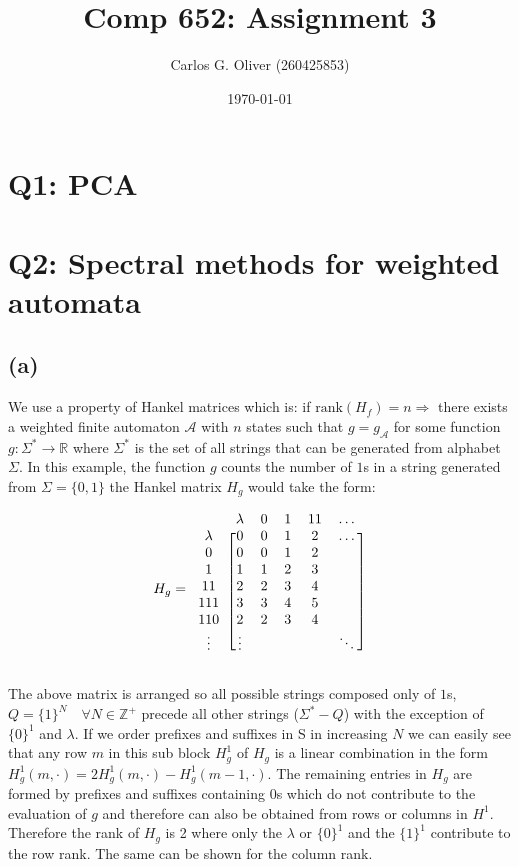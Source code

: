 \documentclass[11pt]{amsart}
\title{Comp 652: Assignment 3}
\author{Carlos G. Oliver (260425853)}
\date{\today}                                           %
\begin{document}
\maketitle

\section{Q1: PCA}

\section{Q2: Spectral methods for weighted automata}
\subsection{(a)}

We use a property of Hankel matrices which is: if $\text{rank}(H_f) = n \Rightarrow$ there exists a weighted finite automaton $\mathcal{A}$  with $n$ states such that $g = g_{\mathcal{A}}$ for some function $g : \Sigma^{*} \rightarrow \mathbb{R}$ where $\Sigma^{*}$ is the set of all strings that can be generated from alphabet $\Sigma$. In this example, the function $g$ counts the number of $1$s in a string generated from $\Sigma = \{0, 1\}$ the Hankel matrix $H_g$ would take the form: 


 
\[
H_g = \begin{blockarray}{cccccc}
\def\ra{\color{red}\ba}
 & \lambda & 0 & 1 & 11 & \hdots \\
\begin{block}{c[ccccc]}
  \lambda & 0 & 0 & 1 & 2 & \hdots \\
  0 & 0 & 0 & 1 & 2 &  \\
  1 & 1 & 1 & 2 & 3 &  \\
  11 & 2 & 2 & 3 & 4 &  \\
  111 & 3 & 3 & 4 & 5 &  \\
  110 & 2 & 2 & 3 & 4 &  \\
  \vdots & \vdots &  &  &  & \ddots \\
\end{block}
\end{blockarray}
\label{mat:h_1}
 \]

The above matrix is arranged so all possible strings composed only of $1$s, $Q = \{1\}^N \quad \forall N \in \mathbb{Z^+}$ precede all other strings ($\Sigma^{*} - Q$) with the exception of $\{0\}^1$ and $\lambda$. If we order prefixes and suffixes in S in increasing $N$ we can easily see that any row $m$ in this sub block $H^{1}_g$ of $H_g$ is a linear combination in the form $H^{1}_g(m, \cdot) = 2H^{1}_g(m, \cdot) - H^{1}_g(m-1, \cdot)$. The remaining entries in $H_g$ are formed by prefixes and suffixes containing $0$s which do not contribute to the evaluation of $g$ and therefore can also be obtained from rows or columns in $H^{1}$. Therefore the rank of $H_g$ is 2 where only the $\lambda$ or $\{0\}^1$ and the $\{1\}^1$ contribute to the row rank. The same can be shown for the column rank.
\end{document}
